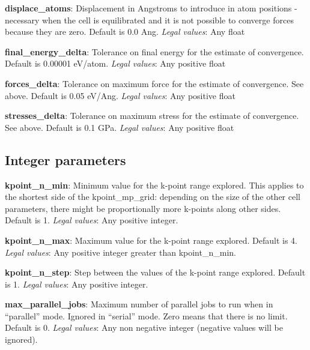 \documentclass[10pt]{article}
\begin{document}
\textbf{displace\_atoms}: Displacement in Angstroms to introduce in atom 
positions - necessary when the cell is equilibrated and it is not possible to 
converge forces because they are zero. Default is 0.0 Ang.\newline
\textit{Legal values}: Any float\newline

\textbf{final\_energy\_delta}: Tolerance on final energy for the estimate of 
convergence. Default is 0.00001 eV/atom.\newline
\textit{Legal values}: Any positive float\newline

\textbf{forces\_delta}: Tolerance on maximum force for the estimate of 
convergence. See above. Default is 0.05 eV/Ang.\newline
\textit{Legal values}: Any positive float\newline

\textbf{stresses\_delta}: Tolerance on maximum stress for the estimate of 
convergence. See above. Default is 0.1 GPa.\newline
\textit{Legal values}: Any positive float\newline

\subsection{Integer parameters}

\textbf{kpoint\_n\_min}: Minimum value for the k-point range explored. This 
applies to the shortest side of the kpoint\_mp\_grid: depending on the size of 
the other cell parameters, there might be proportionally more k-points along 
other sides. Default is 1.\newline
\textit{Legal values}: Any positive integer.\newline

\textbf{kpoint\_n\_max}: Maximum value for the k-point range explored. Default 
is 4.\newline
\textit{Legal values}: Any positive integer greater than kpoint\_n\_min.\newline

\textbf{kpoint\_n\_step}: Step between the values of the k-point range explored. 
Default is 1.\newline
\textit{Legal values}: Any positive integer.\newline

\textbf{max\_parallel\_jobs}: Maximum number of parallel jobs to run when in 
``parallel'' mode. Ignored in ``serial'' mode. Zero means that there is no 
limit. Default is 0.\newline
\textit{Legal values}: Any non negative integer (negative values will be 
ignored).\newline
\end{document}
